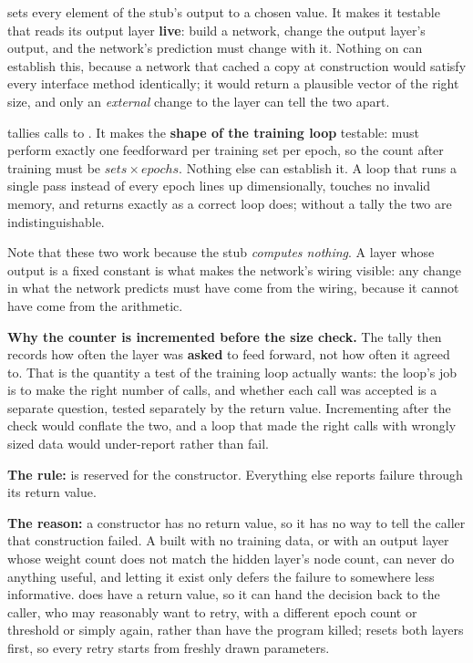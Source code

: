 \textbf{} sets every element of the stub's output to a chosen value. It makes it
testable that  reads its output layer \textbf{live}: build a network, change the
output layer's output, and the network's prediction must change with it. Nothing on
 can establish this, because a network that cached a copy at construction would
satisfy every interface method identically; it would return a plausible vector of the right size,
and only an \emph{external} change to the layer can tell the two apart. 

\textbf{} tallies calls to . It makes the
\textbf{shape of the training loop} testable:  must perform exactly one feedforward
per training set per epoch, so the count after training must be
$\mathit{sets} \times \mathit{epochs}$. Nothing else can establish it. A loop that runs a single
pass instead of every epoch lines up dimensionally, touches no invalid memory, and returns
 exactly as a correct loop does; without a tally the two are indistinguishable.

Note that these two work because the stub \emph{computes nothing}. A layer whose output is a fixed
constant is what makes the network's wiring visible: any change in what the network predicts must
have come from the wiring, because it cannot have come from the arithmetic. 

\textbf{Why the counter is incremented before the size check.} The tally then records how often the
layer was \textbf{asked} to feed forward, not how often it agreed to. That is the quantity a test of
the training loop actually wants: the loop's job is to make the right number of calls, and whether
each call was accepted is a separate question, tested separately by the return value. Incrementing
after the check would conflate the two, and a loop that made the right calls with wrongly sized data
would under-report rather than fail. 

\textbf{The rule:}  is reserved for the constructor. Everything else reports
failure through its return value. 

\textbf{The reason:} a constructor has no return value, so it has no way to tell the caller that
construction failed. A  built with no training data, or with an output layer whose
weight count does not match the hidden layer's node count, can never do anything useful, and
letting it exist only defers the failure to somewhere less informative.  does have a
return value, so it can hand the decision back to the caller, who may reasonably want to retry,
with a different epoch count or threshold or simply again, rather than have the program killed;
 resets both layers first, so every retry starts from freshly drawn parameters.

